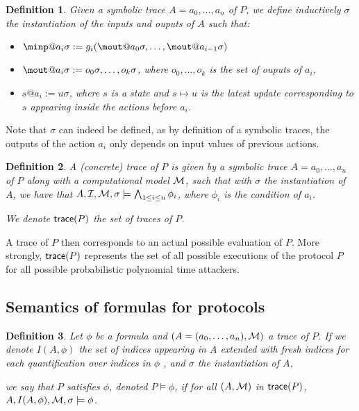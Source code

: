\documentclass[a4paper]{article}
\newtheorem{definition}{Definition}
\theoremstyle{remark}
\begin{document}
\begin{definition}
  Given a symbolic trace $A = a_0,\dots,a_n$ of $P$, we define inductively $\sigma$ the instantiation of the inputs and ouputs of $A$ such that:
  \begin{itemize}
  \item $\minp@a_i\sigma := g_i( \mout@a_0\sigma,\dots,\mout@a_{i-1}\sigma  ) $
  \item $\mout@a_i\sigma := o_0\sigma, \dots, o_k\sigma$, where $o_0,\dots,o_k$ is the set of ouputs of  $a_i$,
    \item $s@a_i := u\sigma$, where $s$ is a state and $s \mapsto u$ is the latest update corresponding to $s$ appearing inside the actions before $a_i$.
\end{itemize}
\end{definition}
Note that $\sigma$ can indeed be defined, as by definition of a symbolic traces, the outputs of the action $a_i$ only depends on input values of previous actions.

\begin{definition}
  A (concrete) trace of $P$ is given by a symbolic trace $A = a_0,\dots,a_n$ of $P$ along with a computational model $\mathcal{M}$, such that with $\sigma$ the instantiation of $A$, we have that $A,\mathcal{I},\mathcal{M},\sigma \models \bigwedge_{1\leq i \leq n} \phi_i$, where $\phi_i$ is the condition of $a_i$.

  We denote $\textsf{trace}(P)$ the set of traces of $P$.
\end{definition}

A trace of $P$ then corresponds to an actual possible evaluation of $P$. More strongly, $\textsf{trace}(P)$ represents the set of all possible executions of the protocol $P$ for all possible probabilistic polynomial time attackers.

\subsection{Semantics of formulas for protocols}

\begin{definition}
  Let $\phi$ be a formula and $(A=(a_0,\dots,a_n),\mathcal{M})$ a trace of $P$. If we denote $I(A,\phi)$ the set of indices appearing in $A$ extended with fresh indices for each quantification over indices in $\phi$ , and $\sigma$ the instantiation of $A$,

we say that $P$ satisfies $\phi$, denoted $P \models \phi$, if for all $(A,\mathcal{M})$ in $\textsf{trace}(P)$, $A, I(A,\phi), \mathcal{M}, \sigma \models \phi$.

\end{definition}
\end{document}
